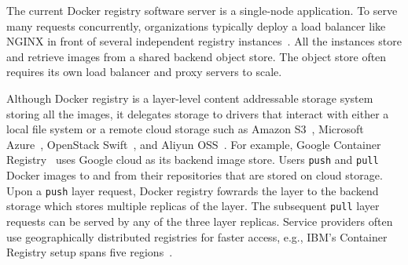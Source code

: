 

The current Docker registry software server is a single-node application.
%
To serve many requests concurrently, organizations typically deploy a load
balancer like NGINX in front of several independent registry
instances~\cite{dockerworkload, anwar-cloud19}.
%
All the instances store and retrieve images from a shared backend object store.
%
The object store often requires its own load balancer and proxy servers to
scale.




Although Docker registry is a layer-level content addressable storage system
storing all the images, it delegates storage to drivers that interact with
either a local file system or a remote cloud storage such as Amazon
S3~\cite{s3}, Microsoft Azure~\cite{azure}, OpenStack Swift~\cite{swift}, and
Aliyun OSS~\cite{aliyun}.
%
For example, Google Container Registry~\cite{GoogleContainerRegistry} uses
Google cloud as its backend image store.  Users \texttt{push} and \texttt{pull}
Docker images to and from their repositories that are stored on cloud storage.
%
Upon a \texttt{push} layer request, Docker registry fowrards the layer to the
backend storage which stores multiple replicas of the layer.
%
The subsequent \texttt{pull} layer requests can be served by any of the three
layer replicas.  Service providers often use geographically distributed
registries for faster access, e.g., IBM's Container Registry setup spans five
regions~\cite{dockerworkload}. 
%




%
%
